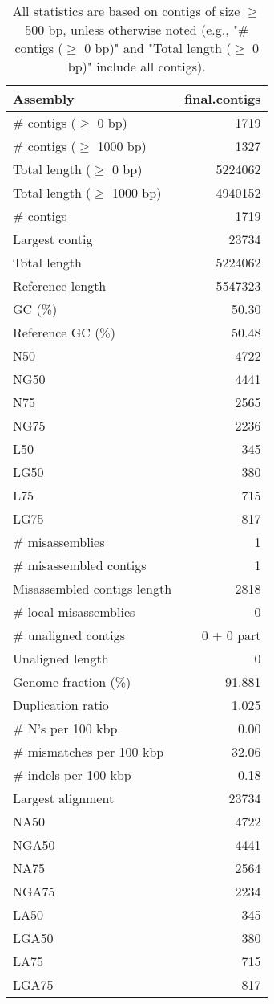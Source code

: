 \documentclass[12pt,a4paper]{article}
\begin{document}
\begin{table}[ht]
\begin{center}
\caption{All statistics are based on contigs of size $\geq$ 500 bp, unless otherwise noted (e.g., "\# contigs ($\geq$ 0 bp)" and "Total length ($\geq$ 0 bp)" include all contigs).}
\begin{tabular}{|l*{1}{|r}|}
\hline
Assembly & final.contigs \\ \hline
\# contigs ($\geq$ 0 bp) & 1719 \\ \hline
\# contigs ($\geq$ 1000 bp) & 1327 \\ \hline
Total length ($\geq$ 0 bp) & 5224062 \\ \hline
Total length ($\geq$ 1000 bp) & 4940152 \\ \hline
\# contigs & 1719 \\ \hline
Largest contig & 23734 \\ \hline
Total length & 5224062 \\ \hline
Reference length & 5547323 \\ \hline
GC (\%) & 50.30 \\ \hline
Reference GC (\%) & 50.48 \\ \hline
N50 & 4722 \\ \hline
NG50 & 4441 \\ \hline
N75 & 2565 \\ \hline
NG75 & 2236 \\ \hline
L50 & 345 \\ \hline
LG50 & 380 \\ \hline
L75 & 715 \\ \hline
LG75 & 817 \\ \hline
\# misassemblies & 1 \\ \hline
\# misassembled contigs & 1 \\ \hline
Misassembled contigs length & 2818 \\ \hline
\# local misassemblies & 0 \\ \hline
\# unaligned contigs & 0 + 0 part \\ \hline
Unaligned length & 0 \\ \hline
Genome fraction (\%) & 91.881 \\ \hline
Duplication ratio & 1.025 \\ \hline
\# N's per 100 kbp & 0.00 \\ \hline
\# mismatches per 100 kbp & 32.06 \\ \hline
\# indels per 100 kbp & 0.18 \\ \hline
Largest alignment & 23734 \\ \hline
NA50 & 4722 \\ \hline
NGA50 & 4441 \\ \hline
NA75 & 2564 \\ \hline
NGA75 & 2234 \\ \hline
LA50 & 345 \\ \hline
LGA50 & 380 \\ \hline
LA75 & 715 \\ \hline
LGA75 & 817 \\ \hline
\end{tabular}
\end{center}
\end{table}
\end{document}
